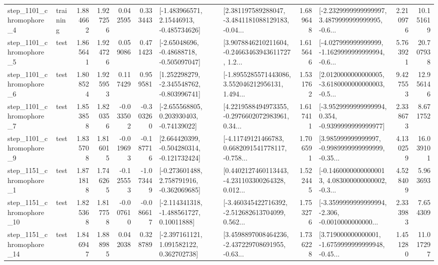 \begin{tabular}{llrrrrllrlrr}
  step\_1101\_chromophore\_4 &  training &      1.884662 &    1.927256 &      0.042595 &  0.333443 &    [-1.483966571, 2.15446913, -0.485734626] &  [2.381197589288047, -3.4841181088129183, -0.04... &       1.689648 &  [-2.2329999999999997, 3.4879999999999995, -0.6... &            2.210976 &         10.151619 \\
  step\_1101\_chromophore\_5 &      test &      1.865641 &    1.924726 &      0.059086 &  0.471423 &    [-2.65048696, -0.48688718, -0.505097047] &  [3.9078846210211604, -0.24663463943611727, 1.2... &       1.615646 &  [-4.027999999999999, -1.1629999999999994, -0.6... &            5.763921 &         20.707938 \\
  step\_1101\_chromophore\_6 &      test &      1.808524 &    1.925953 &      0.117429 &  0.959581 &   [1.252298279, -2.345548762, -0.803996741] &  [-1.8955285571443086, 3.552046212956131, 1.494... &       1.531762 &  [2.0120000000000005, -3.6180000000000003, -0.5... &            9.427553 &         12.956146 \\
  step\_1101\_chromophore\_7 &      test &      1.853858 &    1.820356 &     -0.033502 & -0.303260 &    [-2.655568805, 0.203930403, -0.74139022] &  [4.2219588494973355, -0.2976602072983961, 0.34... &       1.617411 &  [-3.9529999999999994, 0.354, -0.9399999999999977] &            2.338673 &          8.671752 \\
  step\_1101\_chromophore\_9 &      test &      1.835708 &    1.816015 &     -0.019693 & -0.187716 &   [2.664420399, -0.504280314, -0.121732424] &  [-4.11749121466783, 0.6682091541778117, -0.758... &       1.706591 &  [3.985999999999997, -0.9989999999999999, -0.35... &            4.130259 &         16.039101 \\
  step\_1151\_chromophore\_1 &      test &      1.871818 &    1.746265 &     -0.125553 & -1.073449 &   [-0.273601488, 2.758791916, -0.362069685] &  [0.4402127460113443, -4.231103300264328, 0.012... &       1.522445 &  [-0.14600000000000013, 4.083000000000002, -0.3... &            4.528409 &          5.963693 \\
 step\_1151\_chromophore\_10 &      test &      1.825368 &    1.817758 &     -0.007610 & -0.086617 &    [-2.114341318, -1.488561727, 0.10011888] &  [-3.460345422716392, -2.512682613704099, 0.562... &       1.753276 &  [-3.3599999999999994, -2.306, -0.0010000000000... &            2.333983 &          7.654309 \\
 step\_1151\_chromophore\_14 &      test &      1.846947 &    1.888985 &      0.042038 &  0.328789 &    [-2.397161121, 1.091582122, 0.362702738] &  [3.4598897008464236, -2.437229708691955, -0.63... &       1.736228 &  [3.719000000000001, -1.6759999999999948, -0.45... &            1.451280 &         11.017297 \\

\end{tabular}
